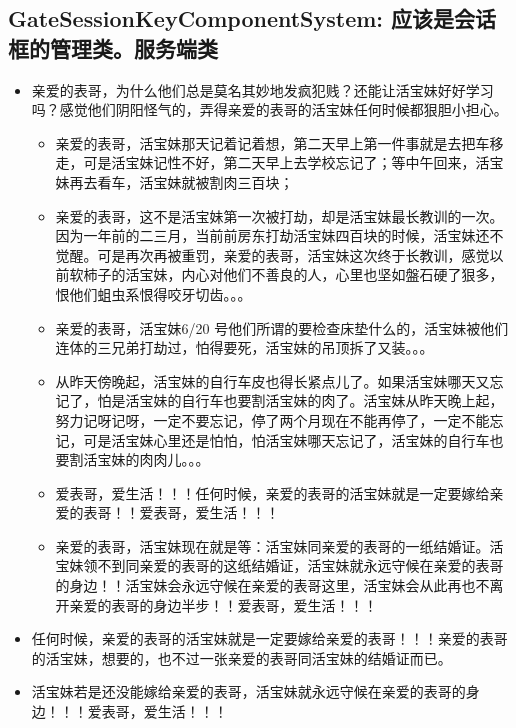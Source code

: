 \documentclass[9pt, b5paper]{article}
\begin{document}
\subsection{GateSessionKeyComponentSystem: 应该是会话框的管理类。服务端类}
\label{sec-7-25}
\begin{itemize}
\item 亲爱的表哥，为什么他们总是莫名其妙地发疯犯贱？还能让活宝妹好好学习吗？感觉他们阴阳怪气的，弄得亲爱的表哥的活宝妹任何时候都狠胆小担心。
\begin{itemize}
\item 亲爱的表哥，活宝妹那天记着记着想，第二天早上第一件事就是去把车移走，可是活宝妹记性不好，第二天早上去学校忘记了；等中午回来，活宝妹再去看车，活宝妹就被割肉三百块；
\item 亲爱的表哥，这不是活宝妹第一次被打劫，却是活宝妹最长教训的一次。因为一年前的二三月，当前前房东打劫活宝妹四百块的时候，活宝妹还不觉醒。可是再次再被重罚，亲爱的表哥，活宝妹这次终于长教训，感觉以前软柿子的活宝妹，内心对他们不善良的人，心里也坚如盤石硬了狠多，恨他们蛆虫系恨得咬牙切齿。。。
\item 亲爱的表哥，活宝妹6/20 号他们所谓的要检查床垫什么的，活宝妹被他们连体的三兄弟打劫过，怕得要死，活宝妹的吊顶拆了又装。。。
\item 从昨天傍晚起，活宝妹的自行车皮也得长紧点儿了。如果活宝妹哪天又忘记了，怕是活宝妹的自行车也要割活宝妹的肉了。活宝妹从昨天晚上起，努力记呀记呀，一定不要忘记，停了两个月现在不能再停了，一定不能忘记，可是活宝妹心里还是怕怕，怕活宝妹哪天忘记了，活宝妹的自行车也要割活宝妹的肉肉儿。。。
\item 爱表哥，爱生活！！！任何时候，亲爱的表哥的活宝妹就是一定要嫁给亲爱的表哥！！爱表哥，爱生活！！！
\item 亲爱的表哥，活宝妹现在就是等：活宝妹同亲爱的表哥的一纸结婚证。活宝妹领不到同亲爱的表哥的这纸结婚证，活宝妹就永远守候在亲爱的表哥的身边！！活宝妹会永远守候在亲爱的表哥这里，活宝妹会从此再也不离开亲爱的表哥的身边半步！！爱表哥，爱生活！！！
\end{itemize}
\item 任何时候，亲爱的表哥的活宝妹就是一定要嫁给亲爱的表哥！！！亲爱的表哥的活宝妹，想要的，也不过一张亲爱的表哥同活宝妹的结婚证而已。
\item 活宝妹若是还没能嫁给亲爱的表哥，活宝妹就永远守候在亲爱的表哥的身边！！！爱表哥，爱生活！！！
\end{itemize}
\end{document}
